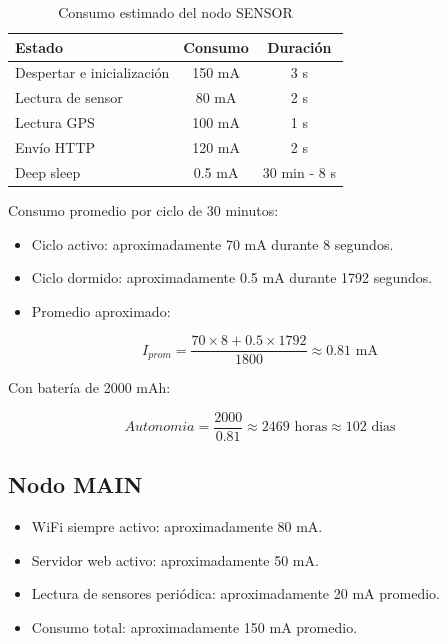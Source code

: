 \documentclass[journal]{IEEEtran}
\begin{document}
\begin{table}[h]
\centering
\caption{Consumo estimado del nodo SENSOR}
\label{tab:consumo_sensor}
\scriptsize
\begin{tabularx}{\columnwidth}{|>{\raggedright\arraybackslash}X|
                                  c|
                                  c|}
\hline
\textbf{Estado} & \textbf{Consumo} & \textbf{Duración} \\
\hline
Despertar e inicialización & 150 mA & 3 s \\
\hline
Lectura de sensor & 80 mA & 2 s \\
\hline
Lectura GPS & 100 mA & 1 s \\
\hline
Envío HTTP & 120 mA & 2 s \\
\hline
Deep sleep & 0.5 mA & 30 min - 8 s \\
\hline
\end{tabularx}
\end{table}

Consumo promedio por ciclo de 30 minutos:

\begin{itemize}
\item Ciclo activo: aproximadamente 70 mA durante 8 segundos.
\item Ciclo dormido: aproximadamente 0.5 mA durante 1792 segundos.
\item Promedio aproximado:
\end{itemize}

\begin{equation}
I_{prom} = \frac{70 \times 8 + 0.5 \times 1792}{1800} \approx 0.81 \text{ mA}
\end{equation}

Con batería de 2000 mAh:

\begin{equation}
Autonomia = \frac{2000}{0.81} \approx 2469 \text{ horas} \approx 102 \text{ dias}
\end{equation}

\subsection{Nodo MAIN}

\begin{itemize}
\item WiFi siempre activo: aproximadamente 80 mA.
\item Servidor web activo: aproximadamente 50 mA.
\item Lectura de sensores periódica: aproximadamente 20 mA promedio.
\item Consumo total: aproximadamente 150 mA promedio.
\end{itemize}
\end{document}
